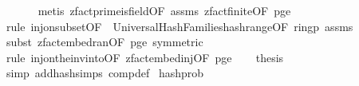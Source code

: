 \begin{isabellebody}
\ \ \ \ \ \isamarkupfalse%
\ {\isacharparenleft}{\kern0pt}metis\ zfact{\isacharunderscore}{\kern0pt}prime{\isacharunderscore}{\kern0pt}is{\isacharunderscore}{\kern0pt}field{\isacharbrackleft}{\kern0pt}OF\ assms{\isacharparenleft}{\kern0pt}{}{\isacharparenright}{\kern0pt}{\isacharbrackright}{\kern0pt}\ zfact{\isacharunderscore}{\kern0pt}finite{\isacharbrackleft}{\kern0pt}OF\ p{\isacharunderscore}{\kern0pt}ge{\isacharunderscore}{\kern0pt}{}{\isacharbrackright}{\kern0pt}{\isacharparenright}{\kern0pt}\isanewline
\ \ \ \ \isamarkupfalse%
\ {\isacharparenleft}{\kern0pt}rule\ inj{\isacharunderscore}{\kern0pt}on{\isacharunderscore}{\kern0pt}subset{\isacharbrackleft}{\kern0pt}OF\ {\isacharunderscore}{\kern0pt}\ Universal{\isacharunderscore}{\kern0pt}Hash{\isacharunderscore}{\kern0pt}Families{\isachardot}{\kern0pt}hash{\isacharunderscore}{\kern0pt}range{\isacharunderscore}{\kern0pt}{}{\isacharbrackleft}{\kern0pt}OF\ ring{\isacharunderscore}{\kern0pt}p\ assms{\isacharparenleft}{\kern0pt}{}{\isacharparenright}{\kern0pt}{\isacharbrackright}{\kern0pt}{\isacharbrackright}{\kern0pt}{\isacharparenright}{\kern0pt}\isanewline
\ \ \ \ \isamarkupfalse%
\ {\isacharparenleft}{\kern0pt}subst\ zfact{\isacharunderscore}{\kern0pt}embed{\isacharunderscore}{\kern0pt}ran{\isacharbrackleft}{\kern0pt}OF\ p{\isacharunderscore}{\kern0pt}ge{\isacharunderscore}{\kern0pt}{}{\isacharcomma}{\kern0pt}\ symmetric{\isacharbrackright}{\kern0pt}{\isacharparenright}{\kern0pt}\isanewline
\ \ \ \ \isamarkupfalse%
\ {\isacharparenleft}{\kern0pt}rule\ inj{\isacharunderscore}{\kern0pt}on{\isacharunderscore}{\kern0pt}the{\isacharunderscore}{\kern0pt}inv{\isacharunderscore}{\kern0pt}into{\isacharbrackleft}{\kern0pt}OF\ zfact{\isacharunderscore}{\kern0pt}embed{\isacharunderscore}{\kern0pt}inj{\isacharbrackleft}{\kern0pt}OF\ p{\isacharunderscore}{\kern0pt}ge{\isacharunderscore}{\kern0pt}{}{\isacharbrackright}{\kern0pt}{\isacharbrackright}{\kern0pt}{\isacharparenright}{\kern0pt}\isanewline
\isanewline
\ \ \isamarkupfalse%
\ {\isacharquery}{\kern0pt}thesis\isanewline
\ \ \ \ \isamarkupfalse%
\ {\isacharparenleft}{\kern0pt}simp\ add{\isacharcolon}{\kern0pt}hash{\isachardot}{\kern0pt}simps\ comp{\isacharunderscore}{\kern0pt}def{\isacharparenright}{\kern0pt}\isanewline
{}\isamarkupfalse%
%
\endisatagproof
{\isafoldproof}%
%
\isadelimproof
\isanewline
%
\endisadelimproof
\isanewline
{}\isamarkupfalse%
\ hash{\isacharunderscore}{\kern0pt}prob{\isacharcolon}{\kern0pt}\isanewline

\end{isabellebody}
